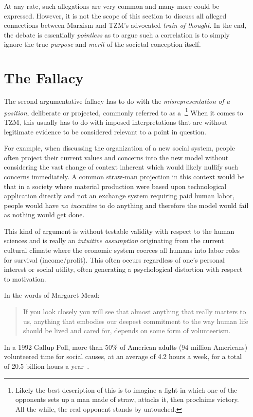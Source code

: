 \documentclass[10pt, a4paper, cleardoubleempty, openright, twoside]{book}
\begin{document}
At any rate, such  allegations are very common
and many more could be expressed. However, it is not the scope of this
section to discuss all alleged connections between Marxism and TZM's
advocated \emph{train of thought}. In the end, the debate is essentially
\emph{pointless} as to argue such a correlation is to simply ignore the
true \emph{purpose} and \emph{merit} of the societal conception itself.

\section {The  Fallacy}

The second argumentative fallacy has to do with the
\emph{misrepresentation of a position}, deliberate or projected,
commonly referred to as a .\footnote{
	Likely the best description of this is to imagine a fight in which one
	of the opponents sets up a man made of straw, attacks it, then
	proclaims victory. All the while, the real opponent stands by
	untouched.
} 
When it comes to TZM, this usually has to do with imposed
interpretations that are without legitimate evidence to be considered
relevant to a point in question. 


For example, when discussing the organization of a new social system,
people often project their current values and concerns into the new
model without considering the vast change of context inherent which
would likely nullify such concerns immediately. A common straw-man
projection in this context would be that in a society where material
production were based upon technological application directly and not an
exchange system requiring paid human labor, people would have \emph{no
incentive} to do anything and therefore the model would fail as nothing
would get done. 

This kind of argument is without testable validity with respect to the
human sciences and is really an \emph{intuitive assumption} originating
from the current cultural climate where the economic system coerces all
humans into labor roles for survival (income/profit). This often occurs
regardless of one's personal interest or social utility, often
generating a psychological distortion with respect to motivation. 

In the words of Margaret Mead:
\blockcquote[p.~301]{Krikorian:VSofD:85}{If you look closely you will
see that almost anything that really matters to us, anything that
embodies our deepest commitment to the way human life should be lived
and cared for, depends on some form of volunteerism.} In a 1992 Gallup
Poll, more than 50\% of American adults (94 million Americans)
volunteered time for social causes, at an average of 4.2 hours a week,
for a total of 20.5 billion hours a year~\cite{Hodgkinson::92}.
\end{document}
